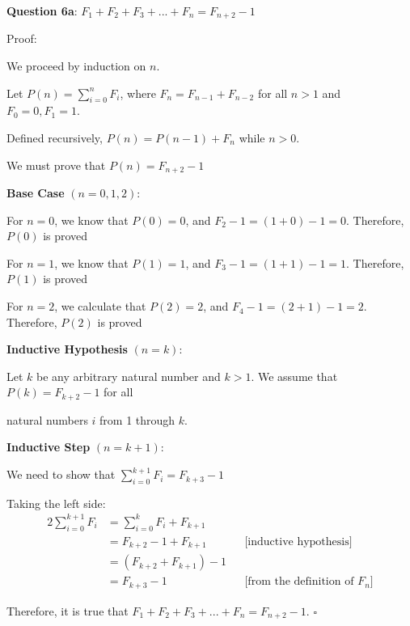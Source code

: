 \documentclass{article} %
\newcommand{\question}[2][]{\begin{flushleft}
        \textbf{Question #1}: #2

\end{flushleft}}
\begin{document}
    \question[6a]{$F_1 + F_2 + F_3 + ... + F_n = F_{n + 2} - 1$}

    Proof: 
    
    We proceed by induction on $n$.

    Let $P(n) = \sum_{i = 0}^{n} F_i$, where $F_n = F_{n - 1} + F_{n - 2}$ for all $n > 1$ and $F_0 = 0, F_1 = 1$.

    Defined recursively, $P(n) = P(n - 1) + F_n$ while $n > 0$.

    We must prove that $P(n) = F_{n + 2} - 1$

    \textbf{Base Case} $(n = 0, 1, 2)$:

    For $n = 0$, we know that $P(0) = 0$, and $F_2 - 1 = (1 + 0) - 1 = 0$. Therefore, $P(0)$ is proved

    For $n = 1$, we know that $P(1) = 1$, and $F_3 - 1 = (1 + 1) - 1 = 1$. Therefore, $P(1)$ is proved

    For $n = 2$, we calculate that $P(2) = 2$, and $F_4 - 1 = (2 + 1) - 1 = 2$. Therefore, $P(2)$ is proved

    \textbf{Inductive Hypothesis} $(n = k)$:

    Let $k$ be any arbitrary natural number and $k > 1$. We assume that $P(k) = F_{k+2} - 1$ for all
    
    natural numbers $i$ from 1 through $k$.

    \textbf{Inductive Step} $(n = k+1)$:

    We need to show that $\sum_{i = 0}^{k+1} F_i = F_{k + 3} - 1$

    Taking the left side:
    \begin{alignat*}{2}
        \sum_{i = 0}^{k+1} F_i &= \sum_{i = 0}^{k} F_i + F_{k + 1}\\
        &= F_{k + 2} - 1 + F_{k + 1}\ &&\text{[inductive hypothesis]}\\
        &= (F_{k + 2} + F_{k + 1}) - 1 \\
        &= F_{k + 3} - 1 &&\text{[from the definition of $F_n$]}
    \end{alignat*}
    
    Therefore, it is true that $F_1 + F_2 + F_3 + ... + F_n = F_{n + 2} - 1$. $\square$

    \newpage

                                                                           
\end{document}
